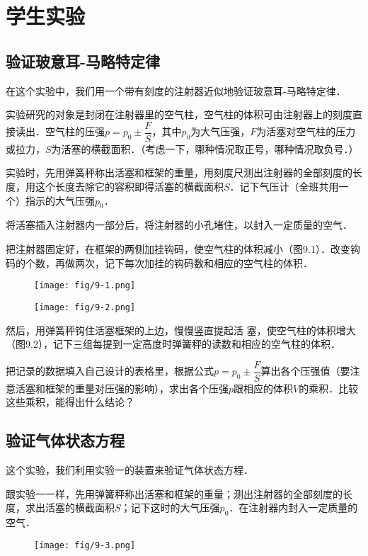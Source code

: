 \chapter{学生实验}

\section{验证玻意耳-马略特定律}

在这个实验中，我们用一个带有刻度的注射器近似地验证玻意耳-马略特定律．

实验研究的对象是封闭在注射器里的空气柱，空气柱的体积可由注射器上的刻度直接读出．空气柱的压强$p=p_0\pm \dfrac{F}{S}$，其中$p_0$为大气压强，$F$为活塞对空气柱的压力或拉力，$S$为活塞的横截面积．（考虑一下，哪种情况取正号，哪种情况取负号．）

实验时，先用弹簧秤称出活塞和框架的重量，用刻度尺测出注射器的全部刻度的长度，用这个长度去除它的容积即得活塞的横截面积$S$．记下气压计（全班共用一个）指示的大气压强$p_0$．

将活塞插入注射器内一部分后，将注射器的小孔堵住，以封入一定质量的空气．

把注射器固定好，在框架的两侧加挂钩码，使空气柱的体积减小（图9.1）．改变钩码的个数，再做两次，记下每次加挂的钩码数和相应的空气柱的体积．
\begin{figure}[htp]
    \centering
    \begin{minipage}[t]{0.48\textwidth}
    \centering
    \texttt{[image: fig/9-1.png]}
    \caption{}
    \end{minipage}
    \begin{minipage}[t]{0.48\textwidth}
    \centering
    \texttt{[image: fig/9-2.png]}
    \caption{}
    \end{minipage}
    \end{figure}

然后，用弹簧秤钩住活塞框架的上边，慢慢竖直提起活
塞，使空气柱的体积增大（图9.2），记下三组每提到一定高度时弹簧秤的读数和相应的空气柱的体积．

把记录的数据填入自己设计的表格里，根据公式$p=p_0\pm \dfrac{F}{S}$算出各个压强值（要注意活塞和框架的重量对压强的影响），求出各个压强$p$跟相应的体积$V$的乘积．比较这些乘积，能得出什么结论？

\section{验证气体状态方程}
这个实验，我们利用实验一的装置来验证气体状态方程．

跟实验一一样，先用弹簧秤称出活塞和框架的重量；测出注射器的全部刻度的长度，求出活塞的横截面积$S$；记下这时的大气压强$p_0$．在注射器内封入一定质量的空气．
\begin{figure}[htp]\centering
    \texttt{[image: fig/9-3.png]}
    \caption{}
    \end{figure}

